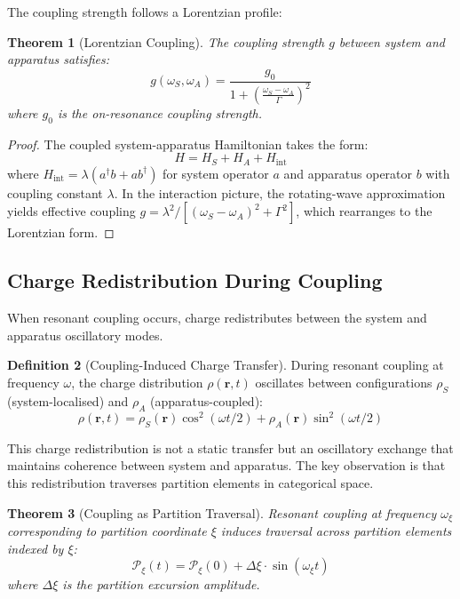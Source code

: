 \documentclass[twocolumn,10pt,a4paper]{article}
\newtheorem{theorem}{Theorem}[section]
\theoremstyle{definition}
\newtheorem{definition}[theorem]{Definition}
\theoremstyle{remark}
\newcommand{\partition}{\mathcal{P}}
\begin{document}
The coupling strength follows a Lorentzian profile:

\begin{theorem}[Lorentzian Coupling]
\label{thm:lorentzian}
The coupling strength $g$ between system and apparatus satisfies:
\begin{equation}
g(\omega_S, \omega_A) = \frac{g_0}{1 + \left(\frac{\omega_S - \omega_A}{\Gamma}\right)^2}
\end{equation}
where $g_0$ is the on-resonance coupling strength.
\end{theorem}

\begin{proof}
The coupled system-apparatus Hamiltonian takes the form:
\begin{equation}
H = H_S + H_A + H_{\mathrm{int}}
\end{equation}
where $H_{\mathrm{int}} = \lambda (a^\dagger b + a b^\dagger)$ for system operator $a$ and apparatus operator $b$ with coupling constant $\lambda$. In the interaction picture, the rotating-wave approximation yields effective coupling $g = \lambda^2/[(\omega_S - \omega_A)^2 + \Gamma^2]$, which rearranges to the Lorentzian form.
\end{proof}

\subsection{Charge Redistribution During Coupling}

When resonant coupling occurs, charge redistributes between the system and apparatus oscillatory modes.

\begin{definition}[Coupling-Induced Charge Transfer]
\label{def:charge_transfer}
During resonant coupling at frequency $\omega$, the charge distribution $\rho(\mathbf{r}, t)$ oscillates between configurations $\rho_S$ (system-localised) and $\rho_A$ (apparatus-coupled):
\begin{equation}
\rho(\mathbf{r}, t) = \rho_S(\mathbf{r}) \cos^2(\omega t/2) + \rho_A(\mathbf{r}) \sin^2(\omega t/2)
\end{equation}
\end{definition}

This charge redistribution is not a static transfer but an oscillatory exchange that maintains coherence between system and apparatus. The key observation is that this redistribution traverses partition elements in categorical space.

\begin{theorem}[Coupling as Partition Traversal]
\label{thm:coupling_partition}
Resonant coupling at frequency $\omega_\xi$ corresponding to partition coordinate $\xi$ induces traversal across partition elements indexed by $\xi$:
\begin{equation}
\partition_\xi(t) = \partition_\xi(0) + \Delta\xi \cdot \sin(\omega_\xi t)
\end{equation}
where $\Delta\xi$ is the partition excursion amplitude.
\end{theorem}
\end{document}
